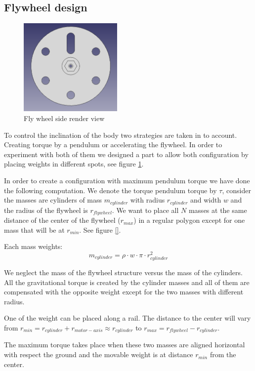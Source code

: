 \subsection{Flywheel design} \label{sec: flywheel design}
\begin{figure}
	\centering
	\includegraphics[width=5cm]{img/fly_wheel_side.png}
	\caption{Fly wheel side render view}
	\label{fig:Fly wheel side render view}
\end{figure}

To control the inclination of the body two strategies are taken in to account.
Creating torque by a pendulum or accelerating the flywheel.
In order to experiment with both of them we designed a part to allow
both configuration by placing weights in different spots, see figure
\ref{fig:Fly wheel side render view}.

In order to create a configuration with maximum pendulum torque
we have done the following computation. We denote the torque pendulum
torque by $\tau$, consider the masses are cylinders of mass $m_{cylinder}$
with radius $r_{cylinder}$ and width $w$ and the radius of the flywheel is $r_{flywheel}$.
We want to place all $N$ masses at the same distance of the center of the flywheel ($r_{max}$) in
a regular polygon except for one mass that will be at $r_{min}$. See figure \ref{}.

Each mass weights:
\[ m_{cylinder} = \rho \cdot w \cdot \pi \cdot r_{cylinder}^2 \]

We neglect the mass of the flywheel structure versus the mass of the cylinders. All
the gravitational torque is created by the cylinder masses and all of them are compensated
with the opposite weight except for the two masses with different radius.

One of the weight can be placed along a rail. The distance to the center will
vary from $r_{min} = r_{cylinder} + r_{motor-axis} \approx r_{cylinder} $ to $r_{max} = r_{flywheel} - r_{cylinder}$.

The maximum torque takes place when these two masses are aligned horizontal with respect the ground and the movable weight is at distance $r_{min}$ from the center.

